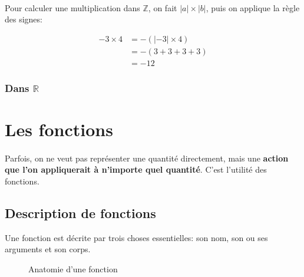 \documentclass[a4paper]{book}
\begin{document}
    \paragraph{}
    Pour calculer une multiplication dans $\mathds{Z}$, on fait $|a| \times |b|$, puis on applique la règle des signes:
    
    \begin{equation*}
        \begin{split}
            -3 \times 4 &= -(|-3| \times 4) \\
                        &= -(3 + 3 + 3 + 3) \\
                        &= -12
        \end{split}
    \end{equation*}
    
    \subsubsection{Dans $\mathds{R}$}
    \paragraph{}
    
    
    
    \section{Les fonctions}
    \paragraph{}
    Parfois, on ne veut pas représenter une quantité directement, mais une \textbf{action que l'on appliquerait à n'importe quel quantité}. C'est l'utilité des fonctions.
    
    \subsection{Description de fonctions}
    Une fonction est décrite par trois choses essentielles: son nom, son ou ses arguments et son corps.
    \begin{figure}[h]
        \centering
        \caption{Anatomie d'une fonction}
        \label{fig:function_anatomy}
    \end{figure}
\end{document}
